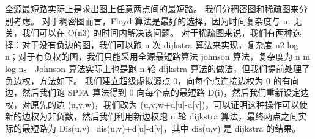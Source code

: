 {}
\markdownRendererSectionEnd 
\markdownRendererSectionEnd \markdownRendererSectionBegin
{}\markdownRendererInterblockSeparator
{}全源最短路实际上是求出图上任意两点间的最短路。\markdownRendererParagraphSeparator
{}我们分稠密图和稀疏图来分别考虑。\markdownRendererParagraphSeparator
{}对于稠密图而言，\markdownRendererDollarSign{}Floyd\markdownRendererDollarSign{} 算法是最好的选择，因为时间复杂度与 \markdownRendererDollarSign{}m\markdownRendererDollarSign{} 无关，我们可以在 \markdownRendererDollarSign{}O(n\markdownRendererCircumflex{}3)\markdownRendererDollarSign{} 的时间内解决该问题。\markdownRendererParagraphSeparator
{}对于稀疏图来说，我们有两种选择：对于没有负边的图，我们可以跑 \markdownRendererDollarSign{}n\markdownRendererDollarSign{} 次 \markdownRendererDollarSign{}dijkstra\markdownRendererDollarSign{} 算法来实现，复杂度 \markdownRendererDollarSign{}n\markdownRendererCircumflex{}2 \markdownRendererBackslash{}log n\markdownRendererDollarSign{}；对于有负权的图，我们只能采用全源最短路算法 \markdownRendererDollarSign{}johnson\markdownRendererDollarSign{} 算法，复杂度为 \markdownRendererDollarSign{}n m \markdownRendererBackslash{}log n\markdownRendererDollarSign{}。\markdownRendererInterblockSeparator
{}\markdownRendererSectionBegin
{}\markdownRendererInterblockSeparator
{}\markdownRendererInterblockSeparator
{}
\markdownRendererSectionEnd \markdownRendererSectionBegin
{}\markdownRendererInterblockSeparator
{}\markdownRendererDollarSign{}Johnson\markdownRendererDollarSign{} 算法实际上也是跑 \markdownRendererDollarSign{}n\markdownRendererDollarSign{} 轮 \markdownRendererDollarSign{}dijkstra\markdownRendererDollarSign{} 算法的做法，但我们提前处理了负边权，方法如下。\markdownRendererParagraphSeparator
{}我们建立超级虚拟源点 \markdownRendererDollarSign{}0\markdownRendererDollarSign{}，向每个点连接边权为 \markdownRendererDollarSign{}0\markdownRendererDollarSign{} 的有向边，然后我们跑 \markdownRendererDollarSign{}SPFA\markdownRendererDollarSign{} 算法得到 \markdownRendererDollarSign{}0\markdownRendererDollarSign{} 向每个点的最短路 \markdownRendererDollarSign{}D(i)\markdownRendererDollarSign{}，然后我们重新设定边权，对原先的边 \markdownRendererDollarSign{}(u,v,w)\markdownRendererDollarSign{}，我们改为 \markdownRendererDollarSign{}(u,v,w+d[u]-d[v])\markdownRendererDollarSign{}，可以证明这种操作可以使新的边权为非负数，然后我们利用新边权跑 \markdownRendererDollarSign{}n\markdownRendererDollarSign{} 轮 \markdownRendererDollarSign{}dijkstra\markdownRendererDollarSign{} 算法，最终两点之间实际的最短路为 \markdownRendererDollarSign{}Dis(u,v)=dis(u,v)+d[u]-d[v]\markdownRendererDollarSign{}，其中 \markdownRendererDollarSign{}dis(u,v)\markdownRendererDollarSign{} 是 \markdownRendererDollarSign{}dijkstra\markdownRendererDollarSign{} 的结果。\markdownRendererParagraphSeparator
